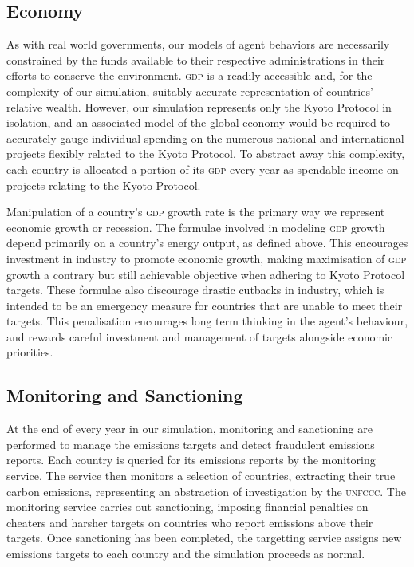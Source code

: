 %
%

\subsection{Economy}

As with real world governments, our models of agent behaviors are necessarily constrained by the funds available to their respective administrations in their efforts to conserve the environment. \textsc{gdp} is a readily accessible and, for the complexity of our simulation, suitably accurate representation of countries' relative wealth. However, our simulation represents only the Kyoto Protocol in isolation, and an associated model of the global economy would be required to accurately gauge individual spending on the numerous national and international projects flexibly related to the Kyoto Protocol. To abstract away this complexity, each country is allocated a portion of its \textsc{gdp} every year as spendable income on projects relating to the Kyoto Protocol.

Manipulation of a country's \textsc{gdp} growth rate is the primary way we represent economic growth or recession. The formulae involved in modeling \textsc{gdp} growth depend primarily on a country's energy output, as defined above. This encourages investment in industry to promote economic growth, making maximisation of \textsc{gdp} growth a contrary but still achievable objective when adhering to Kyoto Protocol targets. These formulae also discourage drastic cutbacks in industry, which is intended to be an emergency measure for countries that are unable to meet their targets. This penalisation encourages long term thinking in the agent's behaviour, and rewards careful investment and management of targets alongside economic priorities.

\subsection{Monitoring and Sanctioning}
At the end of every year in our simulation, monitoring and sanctioning are performed to manage the emissions targets and detect fraudulent emissions reports. Each country is queried for its emissions reports by the monitoring service. The service then monitors a selection of countries, extracting their true carbon emissions, representing an abstraction of investigation by the \textsc{unfccc}. The monitoring service carries out sanctioning, imposing financial penalties on cheaters and harsher targets on countries who report emissions above their targets. Once sanctioning has been completed, the targetting service assigns new emissions targets to each country and the simulation proceeds as normal.

